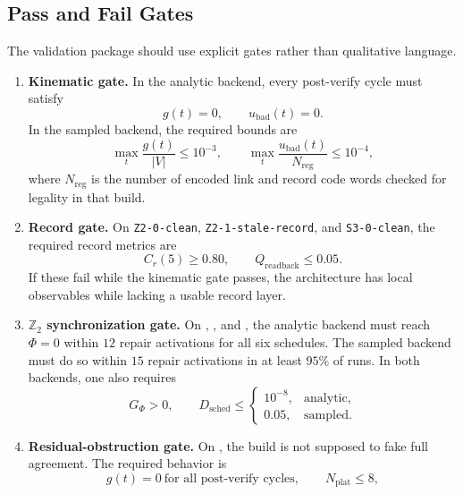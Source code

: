 \documentclass[11pt]{article}
\begin{document}
\subsection{Pass and Fail Gates}

The validation package should use explicit gates rather than qualitative language.
\begin{enumerate}[leftmargin=2em]
\item \textbf{Kinematic gate.}
In the analytic backend, every post-verify cycle must satisfy
\begin{equation}
g(t)=0,
\qquad
u_{\mathrm{bad}}(t)=0.
\end{equation}
In the sampled backend, the required bounds are
\begin{equation}
\max_t \frac{g(t)}{|V|}\le 10^{-3},
\qquad
\max_t \frac{u_{\mathrm{bad}}(t)}{N_{\mathrm{reg}}}\le 10^{-4},
\end{equation}
where $N_{\mathrm{reg}}$ is the number of encoded link and record code words checked for
legality in that build.
\item \textbf{Record gate.}
On \texttt{Z2-0-clean}, \texttt{Z2-1-stale-record}, and \texttt{S3-0-clean}, the required record
metrics are
\begin{equation}
C_r(5)\ge 0.80,
\qquad
Q_{\mathrm{readback}}\le 0.05.
\end{equation}
If these fail while the kinematic gate passes, the architecture has local observables while
lacking a usable record layer.
\item \textbf{$\mathbb Z_2$ synchronization gate.}
On , , and , the
analytic backend must reach $\Phi=0$ within $12$ repair activations for all six schedules. The
sampled backend must do so within $15$ repair activations in at least $95\%$ of runs. In both
backends, one also requires
\begin{equation}
G_{\Phi}>0,
\qquad
D_{\mathrm{sched}}\le
\begin{cases}
10^{-8}, & \text{analytic},\\
0.05, & \text{sampled}.
\end{cases}
\end{equation}
\item \textbf{Residual-obstruction gate.}
On , the build is not supposed to fake full agreement. The
required behavior is
\begin{equation}
g(t)=0\ \text{for all post-verify cycles},
\qquad
N_{\mathrm{plat}}\le 8,
\end{equation}

\end{enumerate}
\end{document}
